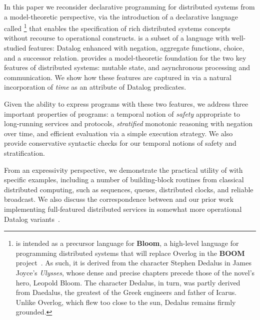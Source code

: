 In this paper we reconsider declarative programming for distributed
systems from a model-theoretic perspective, via the introduction of a
declarative language called \lang\footnote{\small \lang is intended as
  a precursor language for \textbf{Bloom}, a high-level language for
  programming distributed systems that will replace Overlog in the
  \textbf{BOOM} project~\cite{boom-techr}.  As such, it is derived
  from the character Stephen Dedalus in James Joyce's \emph{Ulysses},
  whose dense and precise chapters precede those of the novel's hero,
  Leopold Bloom.  The character Dedalus, in turn, was partly derived
  from Daedalus, the greatest of the Greek engineers and father of
  Icarus.  Unlike Overlog, which flew too close to the sun, Dedalus
  remains firmly grounded.  } that enables the specification of rich
distributed systems concepts without recourse to operational
constructs.  \lang is a subset of a language with well-studied
features: Datalog enhanced with negation, aggregate functions, choice,
and a successor relation.  \lang provides a model-theoretic foundation
for the two key features of distributed systems: mutable state, and
asynchronous processing and communication.  We show how these features
are captured in \lang via a natural incorporation of {\em time} as an
attribute of Datalog predicates.

Given the ability to express programs with these two features, we
address three important properties of \lang programs: a temporal
notion of {\em safety} appropriate to long-running services and
protocols, {\em stratified} monotonic reasoning with negation over
time, and efficient evaluation via a simple execution strategy.  We
also provide conservative syntactic checks for our temporal notions of
safety and stratification.

From an expressivity perspective, we demonstrate the practical utility of \lang with specific examples, including a number of building-block routines from classical distributed computing, such as sequences, queues, distributed clocks, and reliable broadcast.  We also discuss the correspondence between \lang and our prior work implementing full-featured distributed services in somewhat more operational Datalog variants~\cite{Loo2009-CACM,boom-techr}.

